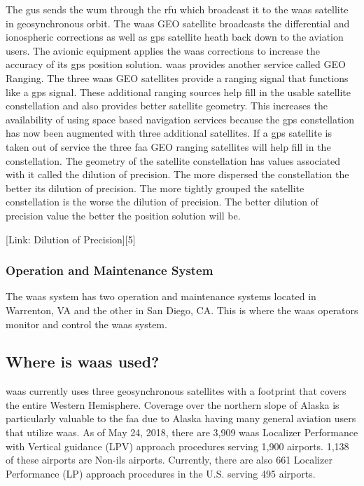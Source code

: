 The \ac{gus} sends the \ac{wum} through the \ac{rfu} which broadcast it to the \ac{waas} satellite in
geosynchronous orbit. The \ac{waas} GEO satellite broadcasts the differential
and ionospheric corrections as well as \ac{gps} satellite heath back down to
the aviation users. The avionic equipment applies the \ac{waas} corrections
to increase the accuracy of its \ac{gps} position solution. \ac{waas} provides
another service called GEO Ranging. The three \ac{waas} GEO satellites
provide a ranging signal that functions like a \ac{gps} signal. These
additional ranging sources help fill in the usable satellite
constellation and also provides better satellite geometry. This
increases the availability of using space based navigation services
because the \ac{gps} constellation has now been augmented with three
additional satellites. If a \ac{gps} satellite is taken out of service the
three \ac{faa} GEO ranging satellites will help fill in the constellation.
The geometry of the satellite constellation has values associated with
it called the dilution of precision. The more dispersed the
constellation the better its dilution of precision. The more tightly
grouped the satellite constellation is the worse the dilution of
precision. The better dilution of precision value the better the
position solution will be.

{[}Link: Dilution of Precision{]}{[}5{]}

\subsubsection{Operation and Maintenance
System}\label{operation-and-maintenance-system}

The \ac{waas} system has two operation and maintenance systems located in
Warrenton, VA and the other in San Diego, CA. This is where the \ac{waas}
operators monitor and control the \ac{waas} system.

\subsection{Where is \ac{waas} used?}\label{where-is-waas-used}

\ac{waas} currently uses three geosynchronous satellites with a footprint
that covers the entire Western Hemisphere. Coverage over the northern
slope of Alaska is particularly valuable to the \ac{faa} due to Alaska having
many general aviation users that utilize \ac{waas}. As of May 24, 2018, there
are 3,909 \ac{waas} Localizer Performance
with Vertical guidance (LPV) approach procedures serving 1,900 airports.
1,138 of these airports are Non-\ac{ils} airports. Currently, there are also
661 Localizer Performance (LP) approach procedures in the U.S. serving
495 airports.

